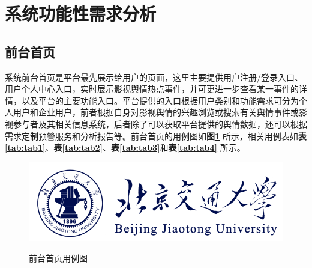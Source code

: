 \section{系统功能性需求分析}
\subsection{前台首页}

系统前台首页是平台最先展示给用户的页面，这里主要提供用户注册/登录入口、用户个人中心入口，实时展示影视舆情热点事件，并可更进一步查看某一事件的详情，以及平台的主要功能入口。平台提供的入口根据用户类别和功能需求可分为个人用户和企业用户，前者根据自身对影视舆情的兴趣浏览或搜索有关舆情事件或影视参与者及其相关信息系统，后者除了可以获取平台提供的舆情数据，还可以根据需求定制预警服务和分析报告等。前台首页的用例图如\textbf{图\ref{fig:fig1}} 所示，相关用例表如\textbf{表\ref{tab:tab1}}、\textbf{表\ref{tab:tab2}}、\textbf{表\ref{tab:tab3}}和\textbf{表\ref{tab:tab4}} 所示。

\begin{figure}[!htb]
	\centering\label{fig:fig1}
	\includegraphics[scale=1]{image/logo1.png}
	\caption{前台首页用例图}
\end{figure}



